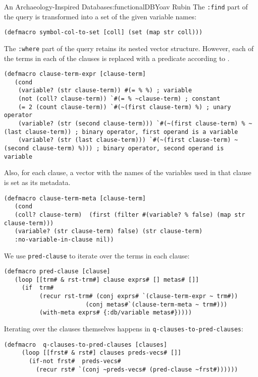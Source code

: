 \begin{aosachapter}{An Archaeology-Inspired Database}{s:functionalDB}{Yoav Rubin}
The \texttt{:find} part of the query is transformed into a set of the
given variable names:

\begin{verbatim}
(defmacro symbol-col-to-set [coll] (set (map str coll)))
\end{verbatim}

The \texttt{:where} part of the query retains its nested vector
structure. However, each of the terms in each of the clauses is replaced
with a predicate according to .

\begin{verbatim}
(defmacro clause-term-expr [clause-term]
   (cond
    (variable? (str clause-term)) #(= % %) ; variable
    (not (coll? clause-term)) `#(= % ~clause-term) ; constant
    (= 2 (count clause-term)) `#(~(first clause-term) %) ; unary operator
    (variable? (str (second clause-term))) `#(~(first clause-term) % ~(last clause-term)) ; binary operator, first operand is a variable
    (variable? (str (last clause-term))) `#(~(first clause-term) ~(second clause-term) %))) ; binary operator, second operand is variable
\end{verbatim}

Also, for each clause, a vector with the names of the variables used in
that clause is set as its metadata.

\begin{verbatim}
(defmacro clause-term-meta [clause-term]
   (cond
   (coll? clause-term)  (first (filter #(variable? % false) (map str clause-term))) 
   (variable? (str clause-term) false) (str clause-term) 
   :no-variable-in-clause nil))
\end{verbatim}

We use \texttt{pred-clause} to iterate over the terms in each clause:

\begin{verbatim}
(defmacro pred-clause [clause]
   (loop [[trm# & rst-trm#] clause exprs# [] metas# []]
     (if  trm#
          (recur rst-trm# (conj exprs# `(clause-term-expr ~ trm#)) 
                       (conj metas#`(clause-term-meta ~ trm#)))
          (with-meta exprs# {:db/variable metas#}))))
\end{verbatim}

Iterating over the clauses themselves happens in
\texttt{q-clauses-to-pred-clauses}:

\begin{verbatim}
(defmacro  q-clauses-to-pred-clauses [clauses]
     (loop [[frst# & rst#] clauses preds-vecs# []]
       (if-not frst#  preds-vecs#
         (recur rst# `(conj ~preds-vecs# (pred-clause ~frst#))))))
\end{verbatim}


\end{aosachapter}
